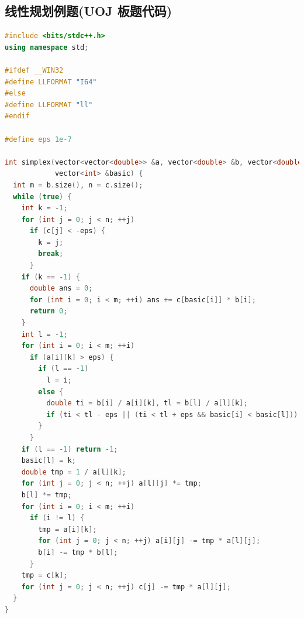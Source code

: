 \documentclass[twoside]{article}
\begin{document}
\subsection{线性规划例题(UOJ 板题代码)}
\begin{lstlisting}[language=c++]
#include <bits/stdc++.h>
using namespace std;

#ifdef __WIN32
#define LLFORMAT "I64"
#else
#define LLFORMAT "ll"
#endif

#define eps 1e-7

int simplex(vector<vector<double>> &a, vector<double> &b, vector<double> &c,
            vector<int> &basic) {
  int m = b.size(), n = c.size();
  while (true) {
    int k = -1;
    for (int j = 0; j < n; ++j)
      if (c[j] < -eps) {
        k = j;
        break;
      }
    if (k == -1) {
      double ans = 0;
      for (int i = 0; i < m; ++i) ans += c[basic[i]] * b[i];
      return 0;
    }
    int l = -1;
    for (int i = 0; i < m; ++i)
      if (a[i][k] > eps) {
        if (l == -1)
          l = i;
        else {
          double ti = b[i] / a[i][k], tl = b[l] / a[l][k];
          if (ti < tl - eps || (ti < tl + eps && basic[i] < basic[l])) l = i;
        }
      }
    if (l == -1) return -1;
    basic[l] = k;
    double tmp = 1 / a[l][k];
    for (int j = 0; j < n; ++j) a[l][j] *= tmp;
    b[l] *= tmp;
    for (int i = 0; i < m; ++i)
      if (i != l) {
        tmp = a[i][k];
        for (int j = 0; j < n; ++j) a[i][j] -= tmp * a[l][j];
        b[i] -= tmp * b[l];
      }
    tmp = c[k];
    for (int j = 0; j < n; ++j) c[j] -= tmp * a[l][j];
  }
}


\end{lstlisting}
\end{document}
